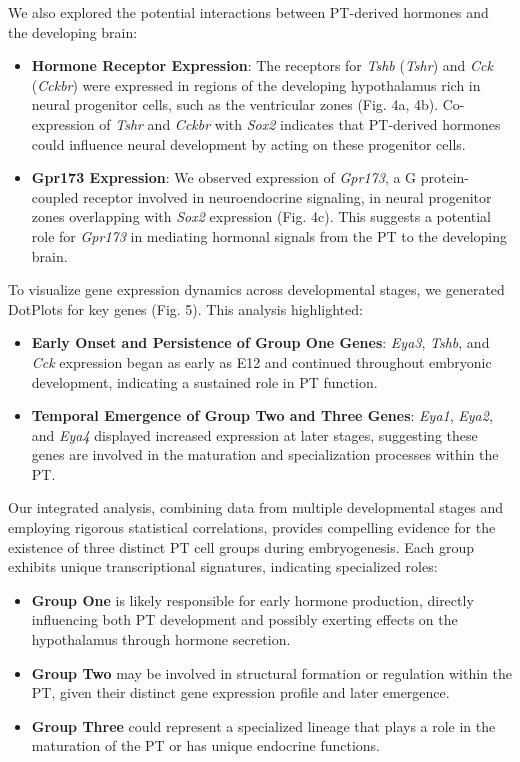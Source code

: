 \documentclass[
  number,
  preprint]{elsarticle}
\providecommand{\tightlist}{%
  \setlength{\itemsep}{0pt}\setlength{\parskip}{0pt}}\usepackage{longtable,booktabs,array}
\begin{document}
We also explored the potential interactions between PT-derived hormones
and the developing brain:

\begin{itemize}
\tightlist
\item
  \textbf{Hormone Receptor Expression}: The receptors for \emph{Tshb}
  (\emph{Tshr}) and \emph{Cck} (\emph{Cckbr}) were expressed in regions
  of the developing hypothalamus rich in neural progenitor cells, such
  as the ventricular zones (Fig. 4a, 4b). Co-expression of \emph{Tshr}
  and \emph{Cckbr} with \emph{Sox2} indicates that PT-derived hormones
  could influence neural development by acting on these progenitor
  cells.
\item
  \textbf{Gpr173 Expression}: We observed expression of \emph{Gpr173}, a
  G protein-coupled receptor involved in neuroendocrine signaling, in
  neural progenitor zones overlapping with \emph{Sox2} expression (Fig.
  4c). This suggests a potential role for \emph{Gpr173} in mediating
  hormonal signals from the PT to the developing brain.
\end{itemize}

To visualize gene expression dynamics across developmental stages, we
generated DotPlots for key genes (Fig. 5). This analysis highlighted:

\begin{itemize}
\tightlist
\item
  \textbf{Early Onset and Persistence of Group One Genes}: \emph{Eya3},
  \emph{Tshb}, and \emph{Cck} expression began as early as E12 and
  continued throughout embryonic development, indicating a sustained
  role in PT function.
\item
  \textbf{Temporal Emergence of Group Two and Three Genes}: \emph{Eya1},
  \emph{Eya2}, and \emph{Eya4} displayed increased expression at later
  stages, suggesting these genes are involved in the maturation and
  specialization processes within the PT.
\end{itemize}

Our integrated analysis, combining data from multiple developmental
stages and employing rigorous statistical correlations, provides
compelling evidence for the existence of three distinct PT cell groups
during embryogenesis. Each group exhibits unique transcriptional
signatures, indicating specialized roles:

\begin{itemize}
\tightlist
\item
  \textbf{Group One} is likely responsible for early hormone production,
  directly influencing both PT development and possibly exerting effects
  on the hypothalamus through hormone secretion.
\item
  \textbf{Group Two} may be involved in structural formation or
  regulation within the PT, given their distinct gene expression profile
  and later emergence.
\item
  \textbf{Group Three} could represent a specialized lineage that plays
  a role in the maturation of the PT or has unique endocrine functions.
\end{itemize}
\end{document}
